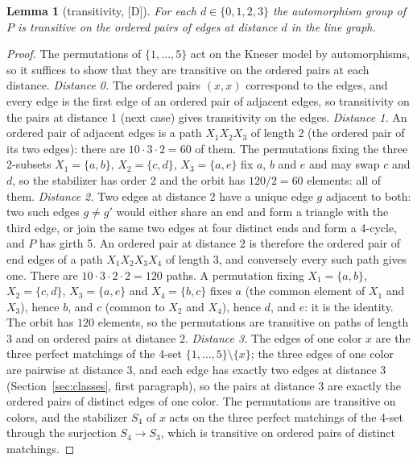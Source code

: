 \documentclass[11pt]{article}
\newtheorem{lemma}[theorem]{Lemma}
\theoremstyle{definition}
\theoremstyle{remark}
\newcommand{\PG}{P}
\newcommand{\claim}[1]{\textup{[#1]}}
\begin{document}
\begin{lemma}[transitivity, \claim{D}]\label{lem:transitive}
For each $d \in \{0, 1, 2, 3\}$ the automorphism group of $\PG$ is transitive on the ordered pairs of edges
at distance $d$ in the line graph.
\end{lemma}

\begin{proof}
The permutations of $\{1, \dots, 5\}$ act on the Kneser model by automorphisms, so it suffices to show
that they are transitive on the ordered pairs at each distance.
\emph{Distance 0.} The ordered pairs $(x, x)$ correspond to the edges, and every edge is the first edge of an ordered pair of
adjacent edges, so transitivity on the pairs at distance 1 (next case) gives transitivity on the edges.
\emph{Distance 1.} An ordered pair of adjacent edges is a path $X_1 X_2 X_3$ of length 2 (the ordered pair of
its two edges): there are $10 \cdot 3 \cdot 2 = 60$ of them. The permutations fixing the three 2-subsets
$X_1 = \{a,b\}$, $X_2 = \{c,d\}$, $X_3 = \{a,e\}$ fix $a$, $b$ and $e$ and may swap $c$ and $d$, so the stabilizer
has order 2 and the orbit has $120/2 = 60$ elements: all of them.
\emph{Distance 2.} Two edges at distance 2 have a unique edge $g$ adjacent to both: two such edges $g \ne g'$
would either share an end and form a triangle with the third edge, or join the same two edges at four distinct
ends and form a 4-cycle, and $\PG$ has girth 5. An ordered pair at distance 2 is therefore the ordered pair of
end edges of a path $X_1 X_2 X_3 X_4$ of length 3, and conversely every such path gives one. There are
$10 \cdot 3 \cdot 2 \cdot 2 = 120$ paths. A permutation fixing $X_1 = \{a,b\}$, $X_2 = \{c,d\}$,
$X_3 = \{a,e\}$ and $X_4 = \{b,c\}$ fixes $a$ (the common element of $X_1$ and $X_3$), hence $b$, and $c$ (common to
$X_2$ and $X_4$), hence $d$, and $e$: it is the identity. The orbit has $120$ elements, so the permutations
are transitive on paths of length 3 and on ordered pairs at distance 2.
\emph{Distance 3.} The edges of one color $x$ are the three perfect matchings of the 4-set $\{1, \dots, 5\} \setminus
\{x\}$; the three edges of one color are pairwise at distance 3, and each edge has exactly two edges at distance 3
(Section~\ref{sec:classes}, first paragraph), so the pairs at distance 3 are exactly the ordered pairs of distinct edges of one color. The
permutations are transitive on colors, and the stabilizer $S_4$ of $x$ acts on the three perfect matchings of the
4-set through the surjection $S_4 \to S_3$, which is transitive on ordered pairs of distinct matchings.
\end{proof}
\end{document}
